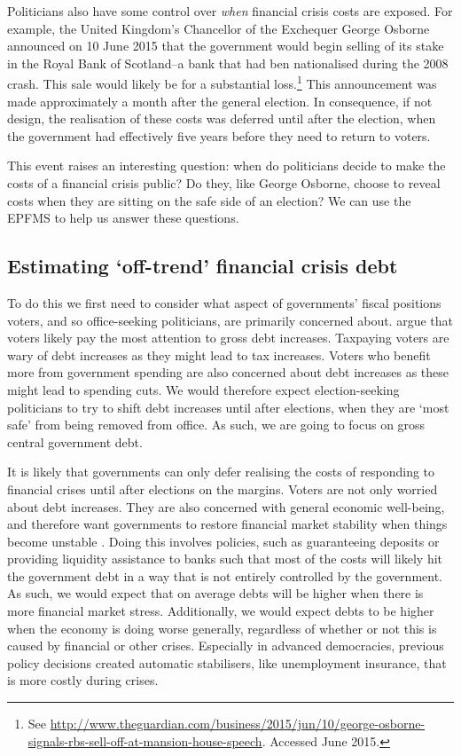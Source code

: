 \documentclass[]{article}
\begin{document}
Politicians also have some control over \emph{when} financial crisis costs are exposed. For example, the United Kingdom's Chancellor of the Exchequer George Osborne announced on 10 June 2015 that the government would begin selling of its stake in the Royal Bank of Scotland--a bank that had ben nationalised during the 2008 crash. This sale would likely be for a substantial loss.\footnote{See \url{http://www.theguardian.com/business/2015/jun/10/george-osborne-signals-rbs-sell-off-at-mansion-house-speech}. Accessed June 2015.} This announcement was made approximately a month after the general election. In consequence, if not design, the realisation of these costs was deferred until after the election, when the government had effectively five years before they need to return to voters.

This event raises an interesting question: when do politicians decide to make the costs of a financial crisis public? Do they, like George Osborne, choose to reveal costs when they are sitting on the safe side of an election? We can use the EPFMS to help us answer these questions.

\subsection{Estimating `off-trend' financial crisis debt}

To do this we first need to consider what aspect of governments' fiscal positions voters, and so office-seeking politicians, are primarily concerned about. \cite{gandrudHallerbergWEP} argue that voters likely pay the most attention to gross debt increases. Taxpaying voters are wary of debt increases as they might lead to tax increases. Voters who benefit more from government spending are also concerned about debt increases as these might lead to spending cuts. We would therefore expect election-seeking politicians to try to shift debt increases until after elections, when they are `most safe' from being removed from office. As such, we are going to focus on gross central government debt.

It is likely that governments can only defer realising the costs of responding to financial crises until after elections on the margins. Voters are not only worried about debt increases. They are also concerned with general economic well-being, and therefore want governments to restore financial market stability when things become unstable \citep{Rosas2009}. Doing this involves policies, such as guaranteeing deposits or providing liquidity assistance to banks such that most of the costs will likely hit the government debt in a way that is not entirely controlled by the government. As such, we would expect that on average debts will be higher when there is more financial market stress. Additionally, we would expect debts to be higher when the economy is doing worse generally, regardless of whether or not this is caused by financial or other crises. Especially in advanced democracies, previous policy decisions created automatic stabilisers, like unemployment insurance, that is more costly during crises.
\end{document}
